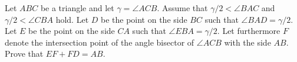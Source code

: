 Let $ABC$ be a triangle and let $\gamma = \angle ACB$.
Assume that $\gamma /2 < \angle BAC$ and $\gamma/2 < \angle CBA$ hold.
Let $D$ be the point on the side $BC$ such that $\angle BAD = \gamma/2$.
Let $E$ be the point on the side $CA$ such that $\angle EBA = \gamma/2$.
Let furthermore $F$ denote the intersection point of the angle bisector of $\angle ACB$ with the side $AB$.
Prove that $EF + FD = AB$.
